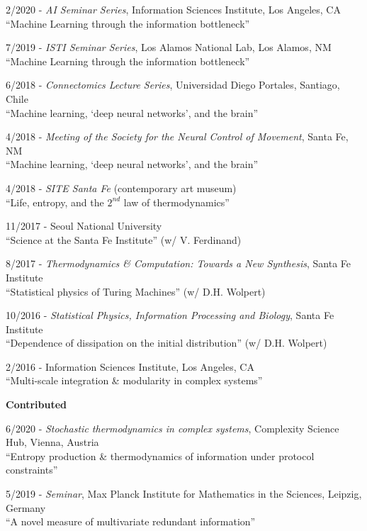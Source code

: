 \documentclass[margin,line,centered]{res}
\begin{document}
\begin{resume}
2/2020 - \emph{AI Seminar Series}, Information Sciences Institute, Los Angeles, CA\\
``Machine Learning through the information bottleneck'' %

7/2019 - \emph{ISTI Seminar Series}, Los Alamos National Lab, Los Alamos, NM\\
``Machine Learning through the information bottleneck''  %


6/2018 - \emph{Connectomics Lecture Series}, Universidad Diego Portales, Santiago, Chile\\
``Machine learning, `deep neural networks', and the brain''  %

4/2018 - \emph{Meeting of the Society for the Neural Control of Movement}, Santa Fe, NM\\
``Machine learning, `deep neural networks', and the brain''

4/2018 - \emph{SITE Santa Fe} (contemporary art museum)\\
``Life, entropy, and the $2^{{nd}}$ law of thermodynamics''

11/2017 - Seoul National University\\
``Science at the Santa Fe Institute'' (w/ V. Ferdinand) %

8/2017 - \emph{Thermodynamics \& Computation: Towards a New Synthesis}, Santa Fe Institute\\
``Statistical physics of Turing Machines'' (w/ D.H. Wolpert) %

10/2016 - \emph{Statistical Physics, Information Processing and Biology}, Santa Fe Institute \\
``Dependence of dissipation on the initial distribution'' (w/ D.H. Wolpert) %

2/2016 - Information Sciences Institute, Los Angeles, CA\\
``Multi-scale integration \& modularity in complex systems'' %


\vspace{5pt}

\textbf{Contributed}

6/2020 - \emph{Stochastic thermodynamics in complex systems}, Complexity Science Hub, Vienna, Austria\\
``Entropy production \& thermodynamics of information under protocol constraints''

5/2019 - \emph{Seminar}, Max Planck Institute for Mathematics in the Sciences, Leipzig, Germany\\
``A novel measure of multivariate redundant information''


\end{resume}
\end{document}
